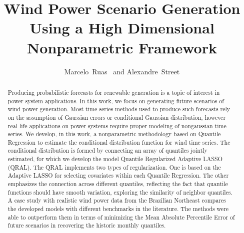 \documentclass[journal]{IEEEtran}
\begin{document}
\title{Wind Power Scenario Generation Using a High Dimensional Nonparametric Framework}

\author{Marcelo~Ruas~%
	and Alexandre~Street%
	
	
}

\maketitle


\begin{abstract}
	Producing probabilistic forecasts for renewable generation is a topic of interest in power system applications. In this work, we focus on generating future scenarios of wind power generation.  Most time series methods used to produce such forecasts rely on the assumption of Gaussian errors or conditional Gaussian distribution, however real life applications on power systems require proper modeling of nongaussian time series.  
	We develop, in this work, a nonparametric methodology based on Quantile Regression to estimate the conditional distribution function for wind time series.  
	The conditional distribution is formed by connecting an array of quantiles jointly estimated, for which we develop the model Quantile Regularized Adaptive LASSO (QRAL).	The QRAL implements two types of regularization. One is based on the Adaptive LASSO for selecting covariates within each Quantile Regression. The other emphasizes the connection across different quantiles, reflecting the fact that quantile functions should have smooth variation,
exploring the similarity of neighbor quantiles.	A case study with realistic wind power data from the Brazilian Northeast compares the developed models with different benchmarks in the literature. The methods were able to outperform them in terms of minimizing the Mean Absolute Percentile Error of future scenarios in recovering the historic monthly quantiles.
\end{abstract}
\end{document}
